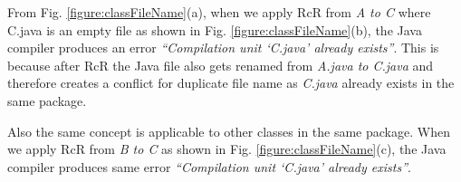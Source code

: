 From Fig. \ref{figure:classFileName}(a), when we apply RcR from \emph{A to C} where C.java is an empty file as shown in Fig. \ref{figure:classFileName}(b), the Java compiler produces an error \textit{``Compilation unit `C.java' already exists''}. This is because after RcR the Java file also gets renamed from \emph{A.java to C.java} and therefore creates a conflict for duplicate file name as \emph{C.java} already exists in the same package. 

Also the same concept is applicable to other classes in the same package. When we apply RcR from \emph{B to C} as shown in Fig. \ref{figure:classFileName}(c), the Java compiler produces same error \textit{``Compilation unit `C.java' already exists''}.  



